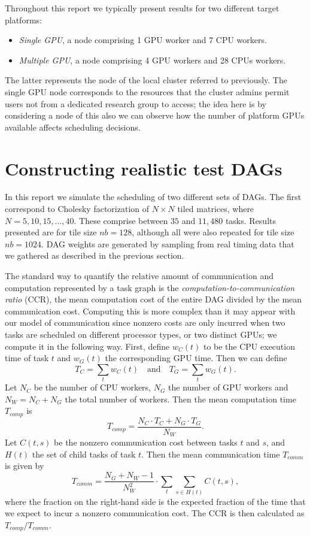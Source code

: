 \documentclass[runningheads]{llncs}
\begin{document}
Throughout this report we typically present results for two different target platforms:
\begin{itemize}
	\item {\em Single GPU}, a node comprising 1 GPU worker and 7 CPU workers. 
	\item {\em Multiple GPU}, a node comprising 4 GPU workers and 28 CPUs workers. 
\end{itemize}
The latter represents the node of the local cluster referred to previously. The single GPU node corresponds to the resources that the cluster admins permit users not from a dedicated research group to access; the idea here is by considering a node of this also we can observe how the number of platform GPUs available affects scheduling decisions.

\section{Constructing realistic test DAGs}
\label{sect.test_DAGs}

In this report we simulate the scheduling of two different sets of DAGs. The first correspond to Cholesky factorization of $N \times N$ tiled matrices, where $N = 5, 10, 15, \dots, 40$. These comprise between $35$ and $11,480$ tasks. Results presented are for tile size $nb = 128$, although all were also repeated for tile size $nb = 1024$.  DAG weights are generated by sampling from real timing data that we gathered as described in the previous section.

The standard way to quantify the relative amount of communication and computation represented by a task graph is the {\em computation-to-communication ratio} (CCR), the mean computation cost of the entire DAG divided by the mean communication cost. Computing this is more complex than it may appear with our model of communication since nonzero costs are only incurred when two tasks are scheduled on different processor types, or two distinct GPUs; we compute it in the following way. First, define $w_C(t)$ to be the CPU execution time of task $t$ and $w_G(t)$ the corresponding GPU time. Then we can define  
\begin{equation}
T_{C} = \sum_t w_C(t) \quad \text{and} \quad T_{G} = \sum_t w_G(t).
\end{equation}
Let $N_C$ be the number of CPU workers, $N_G$ the number of GPU workers and $N_W = N_C + N_G$ the total number of workers. Then the mean computation time $T_{comp}$ is 
\begin{equation}
T_{comp} = \frac{N_C \cdot T_{C} + N_G \cdot T_{G} }{N_W}.
\end{equation}
Let $C(t, s)$ be the nonzero communication cost between tasks $t$ and $s$, and $H(t)$ the set of child tasks of task $t$. Then the mean communication time $T_{comm}$ is given by
\begin{equation}
T_{comm} = \frac{N_G + N_W - 1}{N_W^2} \cdot \sum_{t} \sum_{s \in H(t)} C(t, s),
\end{equation}
where the fraction on the right-hand side is the expected fraction of the time that we expect to incur a nonzero communication cost. The CCR is then calculated as $T_{comp} / T_{comm}$.
\end{document}
